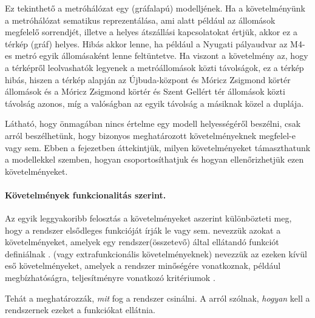 \begin{megjegyzes}
	Ez tekinthető a metróhálózat egy (gráfalapú) modelljének. Ha a követelményünk a metróhálózat sematikus reprezentálása, ami alatt például az állomások megfelelő sorrendjét, illetve a helyes átszállási kapcsolatokat értjük, akkor ez a térkép (gráf) helyes. Hibás akkor lenne, ha például a Nyugati pályaudvar az M4-es metró egyik állomásaként lenne feltüntetve. Ha viszont a követelmény az, hogy a térképről leolvashatók legyenek a metróállomások közti távolságok, ez a térkép hibás, hiszen a térkép alapján az Újbuda-központ és Móricz Zsigmond körtér állomások és a Móricz Zsigmond körtér és Szent Gellért tér állomások közti távolság azonos, míg a valóságban az egyik távolság a másiknak közel a duplája. 
\end{megjegyzes}

Látható, hogy önmagában nincs értelme egy modell helyességéről beszélni, csak arról beszélhetünk, hogy bizonyos meghatározott követelményeknek megfelel-e vagy sem.
Ebben a fejezetben áttekintjük, milyen követelményeket támaszthatunk a modellekkel szemben, hogyan csoportosíthatjuk és hogyan ellenőrizhetjük ezen követelményeket.

\paragraph{Követelmények funkcionalitás szerint.}
Az egyik leggyakoribb felosztás a követelményeket aszerint különbözteti meg, hogy a rendszer elsődleges funkcióját írják le vagy sem.  nevezzük azokat a követelményeket, amelyek egy rendszer(összetevő) által ellátandó funkciót definiálnak \cite{IEEE-24765}.
 (vagy extrafunkcionális követelményeknek) nevezzük az ezeken kívül eső követelményeket, amelyek a rendszer minőségére vonatkoznak, például megbízhatóságra, teljesítményre vonatkozó kritériumok \cite{IEEE-24765}.

\begin{megjegyzes}
Tehát a  meghatározzák, \emph{mit} fog a rendszer csinálni. A  arról szólnak, \emph{hogyan} kell a rendszernek ezeket a funkciókat ellátnia.
\end{megjegyzes}

